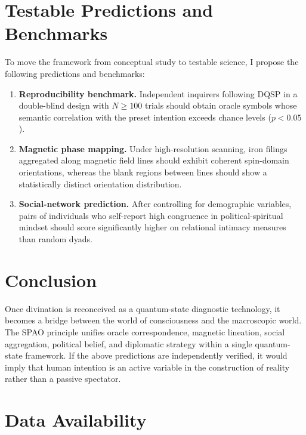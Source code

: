 \documentclass[11pt,a4paper]{article}
\begin{document}

\section{Testable Predictions and Benchmarks}

To move the framework from conceptual study to testable science, I propose the following predictions and benchmarks:

\begin{enumerate}
  \item \textbf{Reproducibility benchmark.} Independent inquirers following DQSP in a double-blind design with $N \geq 100$ trials should obtain oracle symbols whose semantic correlation with the preset intention exceeds chance levels ($p < 0.05$).
  \item \textbf{Magnetic phase mapping.} Under high-resolution scanning, iron filings aggregated along magnetic field lines should exhibit coherent spin-domain orientations, whereas the blank regions between lines should show a statistically distinct orientation distribution.
  \item \textbf{Social-network prediction.} After controlling for demographic variables, pairs of individuals who self-report high congruence in political-spiritual mindset should score significantly higher on relational intimacy measures than random dyads.
\end{enumerate}


\section{Conclusion}

Once divination is reconceived as a quantum-state diagnostic technology, it becomes a bridge between the world of consciousness and the macroscopic world. The SPAO principle unifies oracle correspondence, magnetic lineation, social aggregation, political belief, and diplomatic strategy within a single quantum-state framework. If the above predictions are independently verified, it would imply that human intention is an active variable in the construction of reality rather than a passive spectator.


\section*{Data Availability}
\end{document}

